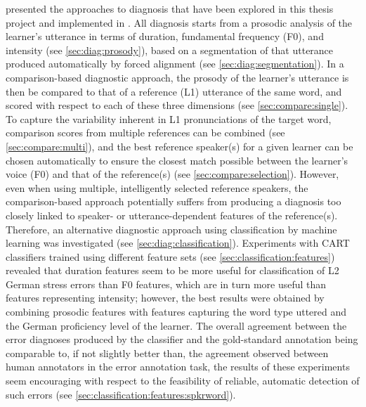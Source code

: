 %
%
 presented the approaches to diagnosis that have been explored in this thesis project and implemented in . All diagnosis starts from a prosodic analysis of the learner's utterance in terms of duration, fundamental frequency (F0), and intensity (see \cref{sec:diag:prosody}), based on a segmentation of that utterance produced automatically by forced alignment (see \cref{sec:diag:segmentation}). 
	In a comparison-based diagnostic approach, the prosody of the learner's utterance is then be compared to that of a reference (L1) utterance of the same word, and scored with respect to each of these three dimensions (see \cref{sec:compare:single}). 
	To capture the variability inherent in L1 pronunciations of the target word, comparison scores from multiple references can be combined (see \cref{sec:compare:multi}), and the best reference speaker(s) for a given learner can be chosen automatically to ensure the closest match possible between the learner's voice (F0) and that of the reference(s) (see \cref{sec:compare:selection}). 
	However, even when using multiple, intelligently selected reference speakers, the comparison-based approach potentially suffers from producing a diagnosis too closely linked to speaker- or utterance-dependent features of the reference(s). Therefore, an alternative diagnostic approach using classification by machine learning was investigated (see \cref{sec:diag:classification}). 
	Experiments with CART classifiers trained using different feature sets (see \cref{sec:classification:features}) revealed that duration features seem to be more useful for classification of L2 German stress errors than F0 features, which are in turn more useful than features representing intensity; however, the best results were obtained by  combining prosodic features with features capturing the word type uttered and the German proficiency level of the learner. 
	The overall agreement between the error diagnoses produced by the classifier and the gold-standard annotation being comparable to, if not slightly better than, the agreement observed between human annotators in the error annotation task, the results of these experiments seem encouraging with respect to the feasibility of reliable, automatic detection of such errors (see \cref{sec:classification:features:spkrword}). 
